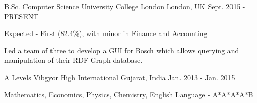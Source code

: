 

\begin{cventries}

  \cventry
    {B.Sc. Computer Science}
    {University College London}
    {London, UK}
    {Sept. 2015 - PRESENT}
    {
      \begin{cvitems}
        \item {Expected - First (82.4\%), with minor in Finance and Accounting}
        \item {Led a team of three to develop a GUI for Bosch which allows querying and manipulation of their RDF Graph database.}
      \end{cvitems}
    }

  \cventry
    {A Levels}
    {Vibgyor High International}
    {Gujarat, India}
    {Jan. 2013 - Jan. 2015}
    {
      \begin{cvitems}
        \item {Mathematics, Economics, Physics, Chemistry, English Language - A*A*A*A*B}
      \end{cvitems}
    }
\end{cventries}
